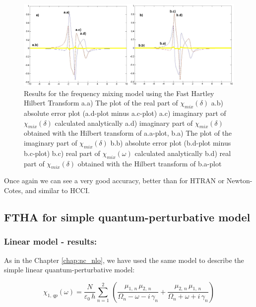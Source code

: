 \documentclass[12pt,twoside,a4paper]{article}
\numberwithin{equation}{subsection}
\numberwithin{figure}{subsection}
\begin{document}
\begin{figure} 
  \includegraphics[width=150mm]{img/fht_fmix.png}
  \caption{Results for the frequency mixing model using the Fast Hartley Hilbert Transform
     a.a) The plot of the real part of ${\chi_{mix}}(\delta )$
     a.b) absolute error plot (a.d-plot minus a.c-plot) 
     a.c) imaginary part of ${\chi_{mix}}(\delta )$ calculated analytically 
     a.d) imaginary part of ${\chi_{mix}}(\delta )$ obtained with the Hilbert transform of a.a-plot, 
     b.a) The plot of the imaginary part of ${\chi_{mix}}(\delta )$ 
     b.b) absolute error plot (b.d-plot minus b.c-plot) 
     b.c) real part of $\chi_{mix} (\omega )$ calculated analytically 
     b.d) real part of ${\chi_{mix}}(\delta )$ obtained with the Hilbert transform of b.a-plot 
     \label{fig:fht_fmix}
     }
\end{figure}

Once again we can see a very good accuracy, better than for HTRAN or Newton-Cotes, and similar to HCCI.

\subsection{FTHA for simple quantum-perturbative model} \label{chap:hartley_quantum}

\subsubsection*{Linear model - results:}

As in the Chapter \ref{chap:nc_nlo}, we have used the same model to describe the simple linear quantum-perturbative model: 

\begin{equation} \label{eq:fht_qp}
  {\chi_{1, \,qp}}(\omega ) = \frac {N}{\varepsilon_0\,h} \sum_{n=1}^{2}\,(\frac {{\mu_{1, \,n}}\,{ \mu_{2, \,n}}}{{\Omega_{n}}
  - \omega  - i\,{\gamma_{n}}} + \frac {{\mu_{2, \,n}}\,{\mu_{1, \,n}}}{{\Omega_{n}} + \omega + i\,{\gamma_{n}}})
\end{equation}
\end{document}

